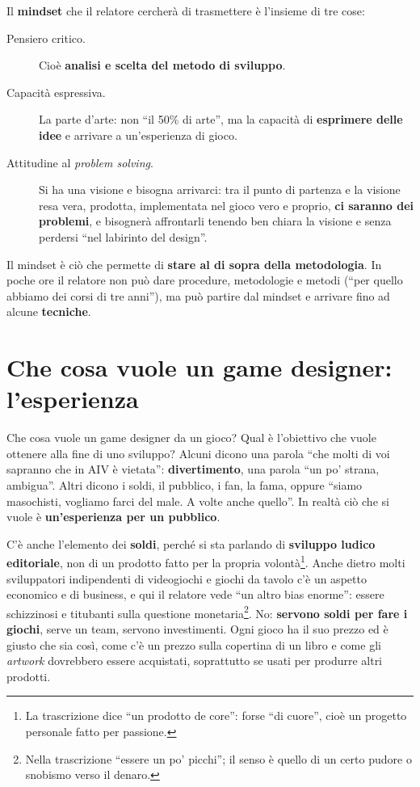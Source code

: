 Il \textbf{mindset} che il relatore cercherà di trasmettere è l'insieme di tre
cose:
\begin{description}
  \item[Pensiero critico.] Cioè \textbf{analisi e scelta del metodo di
        sviluppo}.
  \item[Capacità espressiva.] La parte d'arte: non ``il 50\% di arte'', ma la
        capacità di \textbf{esprimere delle idee} e arrivare a un'esperienza di
        gioco.
  \item[Attitudine al \emph{problem solving}.] Si ha una visione e bisogna
        arrivarci: tra il punto di partenza e la visione resa vera, prodotta,
        implementata nel gioco vero e proprio, \textbf{ci saranno dei
        problemi}, e bisognerà affrontarli tenendo ben chiara la visione e senza
        perdersi ``nel labirinto del design''.
\end{description}
Il mindset è ciò che permette di \textbf{stare al di sopra della metodologia}.
In poche ore il relatore non può dare procedure, metodologie e metodi (``per
quello abbiamo dei corsi di tre anni''), ma può partire dal mindset e arrivare
fino ad alcune \textbf{tecniche}.

\section{Che cosa vuole un game designer: l'esperienza}
\label{sec:z6-esperienza}

Che cosa vuole un game designer da un gioco? Qual è l'obiettivo che vuole
ottenere alla fine di uno sviluppo? Alcuni dicono una parola ``che molti di voi
sapranno che in AIV è vietata'': \textbf{divertimento}, una parola ``un po'
strana, ambigua''. Altri dicono i soldi, il pubblico, i fan, la fama, oppure
``siamo masochisti, vogliamo farci del male. A volte anche quello''. In realtà
ciò che si vuole è \textbf{un'esperienza per un pubblico}.

C'è anche l'elemento dei \textbf{soldi}, perché si sta parlando di
\textbf{sviluppo ludico editoriale}, non di un prodotto fatto per la propria
volontà\footnote{La trascrizione dice ``un prodotto de core'': forse ``di
cuore'', cioè un progetto personale fatto per passione.}. Anche dietro molti
sviluppatori indipendenti di videogiochi e giochi da tavolo c'è un aspetto
economico e di business, e qui il relatore vede ``un altro bias enorme'': essere
schizzinosi e titubanti sulla questione monetaria\footnote{Nella trascrizione
``essere un po' picchi''; il senso è quello di un certo pudore o snobismo verso
il denaro.}. No: \textbf{servono soldi per fare i giochi}, serve un team,
servono investimenti. Ogni gioco ha il suo prezzo ed è giusto che sia così,
come c'è un prezzo sulla copertina di un libro e come gli \emph{artwork}
dovrebbero essere acquistati, soprattutto se usati per produrre altri prodotti.

